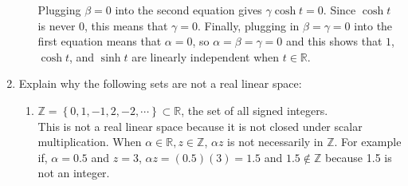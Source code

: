 \documentclass[11pt]{amsart}
\theoremstyle{plain}
\theoremstyle{definition}
\begin{document}
\begin{enumerate}
\begin{enumerate}
Plugging $\beta = 0$ into the second equation gives $\gamma \cosh t = 0$. Since $\cosh t$ is never 0, this means that $\gamma = 0$. Finally, plugging in $\beta = \gamma = 0$ into the first equation means that $\alpha = 0$, so $\alpha = \beta = \gamma = 0$ and this shows that $1$, $\cosh t$, and $\sinh t$ are linearly independent when $t \in \mathbb{R}$. \\
\end{enumerate}

\bigskip


\item
Explain why the following sets are not a real linear space:
\begin{enumerate}
\item $\mathbb{Z}=\left\{ 0,1,-1,2,-2,\cdots\right\} \subset\mathbb{R}$,
the set of all signed integers. \\
This is not a real linear space because it is not closed under scalar multiplication. When $\alpha \in \mathbb{R}, z \in \mathbb{Z}$, $\alpha z$ is not necessarily in $\mathbb{Z}$. For example if, $\alpha = 0.5$ and $z = 3$, $\alpha z = (0.5)(3) = 1.5$ and $1.5 \notin \mathbb{Z}$ because 1.5 is not an integer. \\


\end{enumerate}
\end{enumerate}
\end{document}
